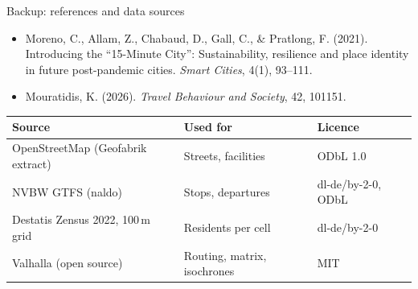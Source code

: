 \documentclass[aspectratio=169,10pt]{beamer}
\begin{document}
\begin{frame}{Backup: references and data sources}
  \footnotesize
  \begin{itemize}
    \item Moreno, C., Allam, Z., Chabaud, D., Gall, C., \& Pratlong, F. (2021). Introducing the
          ``15-Minute City'': Sustainability, resilience and place identity in future
          post-pandemic cities. \emph{Smart Cities}, 4(1), 93--111.
    \item Mouratidis, K. (2026). \emph{Travel Behaviour and Society}, 42, 101151.
  \end{itemize}
  \medskip
  \begin{tabular}{@{}lll@{}}
    \toprule
    Source & Used for & Licence \\
    \midrule
    OpenStreetMap (Geofabrik extract) & Streets, facilities & ODbL 1.0 \\
    NVBW GTFS (naldo) & Stops, departures & dl-de/by-2-0, ODbL \\
    Destatis Zensus 2022, 100\,m grid & Residents per cell & dl-de/by-2-0 \\
    Valhalla (open source) & Routing, matrix, isochrones & MIT \\
    \bottomrule
  \end{tabular}
\end{frame}
\end{document}

